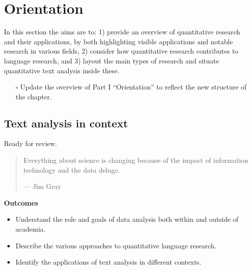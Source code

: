 \documentclass[
  letterpaper,
  DIV=11,
  numbers=noendperiod]{scrreport}
\providecommand{\tightlist}{%
  \setlength{\itemsep}{0pt}\setlength{\parskip}{0pt}}\usepackage{longtable,booktabs,array}
\theoremstyle{definition}
\theoremstyle{remark}
\begin{document}
\part{Orientation}

In this section the aims are to: 1) provide an overview of quantitative
research and their applications, by both highlighting visible
applications and notable research in various fields, 2) consider how
quantitative research contributes to language research, and 3) layout
the main types of research and situate quantitative text analysis inside
these.

\begin{itemize}
\tightlist
\item[$\square$]
   Update the overview of Part I ``Orientation'' to
  reflect the new structure of the chapter.
\end{itemize}

\hypertarget{sec-text-analysis-in-context}{%
\chapter{Text analysis in context}\label{sec-text-analysis-in-context}}

\begin{tcolorbox}[enhanced jigsaw, breakable, colback=white, opacitybacktitle=0.6, coltitle=black, left=2mm, toptitle=1mm, titlerule=0mm, arc=.35mm, title=\textcolor{quarto-callout-tip-color}{\faLightbulb}\hspace{0.5em}{Draft}, rightrule=.15mm, colframe=quarto-callout-tip-color-frame, bottomtitle=1mm, colbacktitle=quarto-callout-tip-color!10!white, toprule=.15mm, leftrule=.75mm, bottomrule=.15mm, opacityback=0]

Ready for review.

\end{tcolorbox}

\begin{quote}
Everything about science is changing because of the impact of
information technology and the data deluge.

--- Jim Gray
\end{quote}

\begin{tcolorbox}[enhanced jigsaw, breakable, colback=white, rightrule=.15mm, arc=.35mm, left=2mm, toprule=.15mm, leftrule=.75mm, bottomrule=.15mm, opacityback=0]

\textbf{ Outcomes}

\begin{itemize}
\tightlist
\item
  Understand the role and goals of data analysis both within and outside
  of academia.
\item
  Describe the various approaches to quantitative language research.
\item
  Identify the applications of text analysis in different contexts.
\end{itemize}

\end{tcolorbox}
\end{document}
